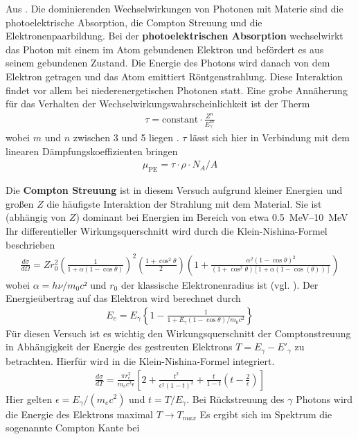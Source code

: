 Aus \cite{book:gil}. Die dominierenden Wechselwirkungen von Photonen mit
Materie sind die photoelektrische Absorption, die Compton Streuung und die
Elektronenpaarbildung. Bei der \textbf{photoelektrischen Absorption}
wechselwirkt das Photon mit einem im Atom gebundenen Elektron und befördert es
aus seinem gebundenen Zustand. Die Energie des Photons wird danach von dem
Elektron getragen und das Atom emittiert Röntgenstrahlung. Diese Interaktion
findet vor allem bei niederenergetischen Photonen statt. Eine grobe Annäherung
für das Verhalten der Wechselwirkungswahrscheinlichkeit ist der Therm
\begin{align}
	\tau = \text{constant} \cdot \frac{Z^n}{E_{\gamma}^{m}}
\end{align} %
wobei $m$ und $n$ zwischen 3 und 5 liegen \cite[vgl.][Kap 2.2.1]{book:gil}.
$\tau$ lässt sich hier in Verbindung mit dem linearen Dämpfungskoeffizienten bringen
\begin{align}
	\mu_{\text{PE}} = \tau \cdot \rho \cdot N_A /A
\end{align}

Die \textbf{Compton Streuung} ist in diesem Versuch aufgrund kleiner Energien
und großen $Z$ die häufigste Interaktion der Strahlung mit dem Material. Sie
ist (abhängig von $Z$) dominant bei Energien im Bereich von etwa
\qtyrange{0.5}{10}{\MeV} Ihr differentieller Wirkungsquerschnitt wird durch die
Klein-Nishina-Formel beschrieben
\begin{align}
	\frac{d\sigma}{d \Omega} = Z r_0^2 \left(\frac{1}{1+\alpha(1-\cos\theta)}\right)^2
	\left(\frac{1+ \cos^2\theta}{2}\right)%
	\left(1+ \frac{\alpha^2(1-\cos \theta)^2}{(1+\cos^2 \theta)[1+\alpha(1-\cos(\theta))]}\right)
	\label{eq:wq_compton}
\end{align}%
wobei $\alpha = h \nu / m_0 c²$ und $r_0$ der klassische Elektronenradius ist (vgl. \cite{book:knoll}).
Der Energieübertrag auf das Elektron wird berechnet durch
\begin{align}
	E_{e} = E_{\gamma} \left\{1- \frac{1}{1+ E_{\gamma}(1-\cos\theta)/m_0 c^2} \right\}
	\label{eq:ecompton}
\end{align}
Für diesen Versuch ist es wichtig den Wirkungsquerschnitt der Comptonstreuung in Abhängigkeit der
Energie des gestreuten Elektrons $T = E_{\gamma} - E'_{\gamma}$ zu betrachten.
Hierfür wird in \cite[][Kap. 3.5.3]{book:kolano} die Klein-Nishina-Formel integriert.
\begin{align}
	\frac{d \sigma}{d T} =  \frac{\pi r_{e}^{2}}{m_e c^2 \epsilon}%
	\left[2 + \frac{t^2}{\epsilon^2(1-t)^2} + \frac{t}{1-t} %
		\left(t - \frac{2}{\epsilon} \right) \right]
	\label{eq:compton_energie}
\end{align}
Hier gelten $\epsilon = E_{\gamma} / (m_e c^2)$ und $t = T/ E_\gamma$.
Bei Rückstreuung des $\gamma$ Photons wird die Energie des Elektrons maximal
$T \rightarrow T_{max}$
Es ergibt sich im Spektrum die sogenannte Compton Kante bei

